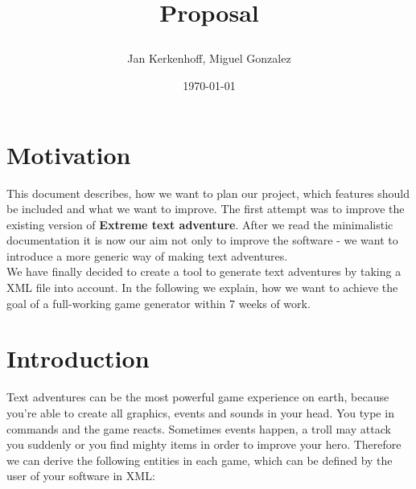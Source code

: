 \documentclass[dvips,12pt]{article}
\begin{document}
\title{
\begin{center}
\end{center}
Proposal
}

\author{Jan Kerkenhoff, Miguel Gonzalez}
\date{\today}

\maketitle

\section{Motivation}

This document describes, how we want to plan our project, which features should be included and what we want to improve. The first attempt was to improve the existing version of \textbf{Extreme text adventure}. After we read the minimalistic documentation it is now our aim not only to improve the software - we want to introduce a more generic way of making text adventures.\\

We have finally decided to create a tool to generate text adventures by taking a XML file into account. In the following we explain, how we want to achieve the goal of a full-working game generator within 7 weeks of work.

\section{Introduction}

Text adventures can be the most powerful game experience on earth, because you're able to create all graphics, events and sounds in your head. You type in commands and the game reacts. Sometimes events happen, a troll may attack you suddenly or you find mighty items in order to improve your hero. Therefore we can derive the following entities in each game, which can be defined by the user of your software in XML:
\end{document}
